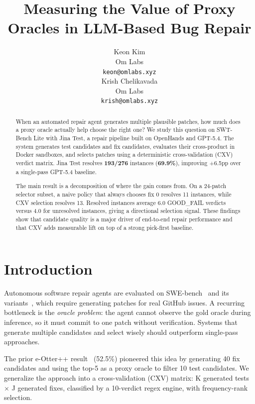\documentclass{article}
\title{Measuring the Value of Proxy Oracles in LLM-Based Bug Repair}
\author{
  Keon Kim \\
  Om Labs \\
  \texttt{keon@omlabs.xyz} \\
  \And
  Krish Chelikavada \\
  Om Labs \\
  \texttt{krish@omlabs.xyz} \\
}
\begin{document}
\maketitle

\begin{abstract}
When an automated repair agent generates multiple plausible patches, how much does a proxy oracle actually help choose the right one? We study this question on SWT-Bench Lite with Jina Test, a repair pipeline built on OpenHands and GPT-5.4. The system generates test candidates and fix candidates, evaluates their cross-product in Docker sandboxes, and selects patches using a deterministic cross-validation (CXV) verdict matrix. Jina Test resolves \textbf{193/276} instances (\textbf{69.9\%}), improving +6.5pp over a single-pass GPT-5.4 baseline.

The main result is a decomposition of where the gain comes from. On a 24-patch selector subset, a naive policy that always chooses fix 0 resolves 11 instances, while CXV selection resolves 13. Resolved instances average 6.0 GOOD\_FAIL verdicts versus 4.0 for unresolved instances, giving a directional selection signal. These findings show that candidate quality is a major driver of end-to-end repair performance and that CXV adds measurable lift on top of a strong pick-first baseline.
\end{abstract}


\section{Introduction}

Autonomous software repair agents are evaluated on SWE-bench~\cite{jimenez2024swe} and its variants~\cite{mundler2024swt}, which require generating patches for real GitHub issues. A recurring bottleneck is the \emph{oracle problem}: the agent cannot observe the gold oracle during inference, so it must commit to one patch without verification. Systems that generate multiple candidates and select wisely should outperform single-pass approaches.

The prior e-Otter++ result~\cite{chen2024e} (52.5\%) pioneered this idea by generating 40 fix candidates and using the top-5 as a proxy oracle to filter 10 test candidates. We generalize the approach into a cross-validation (CXV) matrix: K generated tests $\times$ J generated fixes, classified by a 10-verdict regex engine, with frequency-rank selection.
\end{document}
